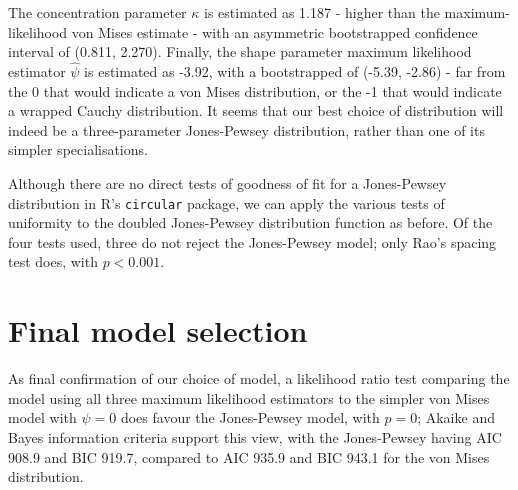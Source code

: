 \documentclass[12pt,fleqn]{article} %
\begin{document}
The concentration parameter $\kappa$ is estimated as 1.187 - higher than the maximum-likelihood von Mises estimate - with an asymmetric bootstrapped confidence interval of (0.811, 2.270). Finally, the shape parameter maximum likelihood estimator $\hat{\psi}$ is estimated as -3.92, with a bootstrapped  of (-5.39, -2.86) - far from the 0 that would indicate a von Mises distribution, or the -1 that would indicate a wrapped Cauchy distribution. It seems that our best choice of distribution will indeed be a three-parameter Jones-Pewsey distribution, rather than one of its simpler specialisations.

Although there are no direct tests of goodness of fit for a Jones-Pewsey distribution in R's \texttt{circular} package, we can apply the various tests of uniformity to the doubled Jones-Pewsey distribution function as before. Of the four tests used, three do not reject the Jones-Pewsey model; only Rao's spacing test does, with $p < 0.001$.

\section{Final model selection}
As final confirmation of our choice of model, a likelihood ratio test comparing the model using all three maximum likelihood estimators to the simpler von Mises model with $\psi = 0$ does favour the Jones-Pewsey model, with $p = 0$; Akaike and Bayes information criteria support this view, with the Jones-Pewsey having AIC 908.9 and BIC 919.7, compared to AIC 935.9 and BIC 943.1 for the von Mises distribution. 

 
  
\end{document}
